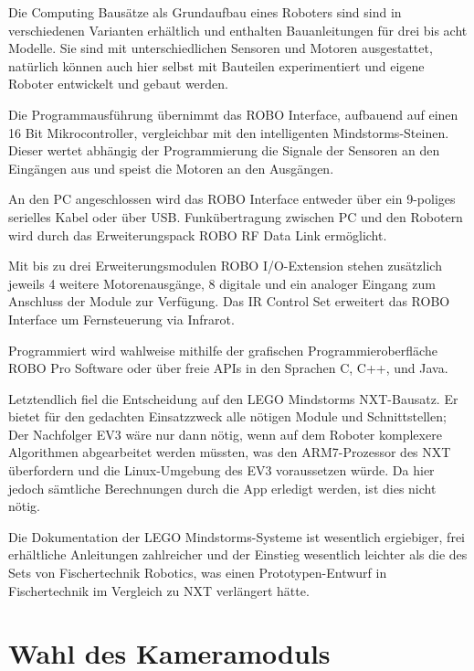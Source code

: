 Die Computing Bausätze als Grundaufbau eines Roboters sind sind in verschiedenen Varianten erhältlich und enthalten Bauanleitungen für drei bis acht Modelle. Sie sind mit unterschiedlichen Sensoren und Motoren ausgestattet, natürlich können auch hier selbst mit Bauteilen experimentiert und eigene Roboter entwickelt und gebaut werden.

Die Programmausführung übernimmt das ROBO Interface, aufbauend auf einen 16 Bit Mikrocontroller, vergleichbar mit den intelligenten Mindstorms-Steinen. Dieser wertet abhängig der Programmierung die Signale der Sensoren an den Eingängen aus und speist die Motoren an den Ausgängen.

An den PC angeschlossen wird das ROBO Interface entweder über ein 9-poliges serielles Kabel oder über USB. Funkübertragung zwischen PC und den Robotern wird durch das Erweiterungspack ROBO RF Data Link ermöglicht.

Mit bis zu drei Erweiterungsmodulen ROBO I/O-Extension stehen zusätzlich jeweils 4 weitere Motorenausgänge, 8 digitale und ein analoger Eingang zum Anschluss der Module zur Verfügung. Das IR Control Set erweitert das ROBO Interface um Fernsteuerung via Infrarot.

Programmiert wird wahlweise mithilfe der grafischen Programmieroberfläche ROBO Pro Software oder über freie APIs in den Sprachen C, C++, und Java.

\vspace{2em}

Letztendlich fiel die Entscheidung auf den LEGO Mindstorms NXT-Bausatz. Er bietet für den gedachten Einsatzzweck alle nötigen Module und Schnittstellen; Der Nachfolger EV3 wäre nur dann nötig, wenn auf dem Roboter komplexere Algorithmen abgearbeitet werden müssten, was den ARM7-Prozessor des NXT überfordern und die Linux-Umgebung des EV3 voraussetzen würde. Da hier jedoch sämtliche Berechnungen durch die App erledigt werden, ist dies nicht nötig.

Die Dokumentation der LEGO Mindstorms-Systeme ist wesentlich ergiebiger, frei erhältliche Anleitungen zahlreicher und der Einstieg wesentlich leichter als die des Sets von Fischertechnik Robotics, was einen Prototypen-Entwurf in Fischertechnik im Vergleich zu NXT verlängert hätte.

\section{Wahl des Kameramoduls}
\label{sec:Kamera}

